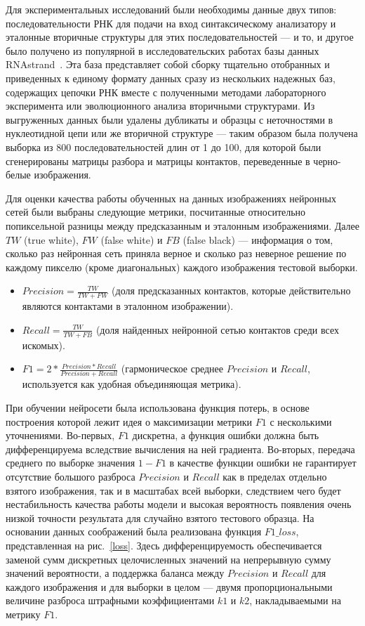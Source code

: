 Для экспериментальных исследований были необходимы данные двух типов: последовательности РНК для подачи на вход синтаксическому анализатору и эталонные вторичные структуры для этих последовательностей --- и то, и другое было получено из популярной в исследовательских работах базы данных RNAstrand~\cite{andronescu2008rna}. Эта база представляет собой сборку тщательно отобранных и приведенных к единому формату данных сразу из нескольких надежных баз, содержащих цепочки РНК вместе с полученными методами лабораторного эксперимента или эволюционного анализа вторичными структурами. Из выгруженных данных были удалены дубликаты и образцы с неточностями в нуклеотидной цепи или же вторичной структуре --- таким образом была получена выборка из 800 последовательностей длин от 1 до 100, для которой были сгенерированы матрицы разбора и матрицы контактов, переведенные в черно-белые изображения.

Для оценки качества работы обученных на данных изображениях нейронных сетей были выбраны следующие метрики, посчитанные относительно попиксельной разницы между предсказанным и эталонным изображениями. Далее $TW$ (true white), $FW$ (false white) и $FB$ (false black) --- информация о том, сколько раз нейронная сеть приняла верное и сколько раз неверное решение по каждому пикселю (кроме диагональных) каждого изображения тестовой выборки.
\begin{itemize} 
    \item $Precision = \frac{TW}{TW + FW}$ (доля предсказанных контактов, которые действительно являются контактами в эталонном изображении).
    \item $Recall = \frac{TW}{TW + FB}$ (доля найденных нейронной сетью контактов среди всех искомых).
    \item $F1 = 2 * \frac{Precision * Recall}{Precision + Recall}$ (гармоническое среднее $Precision$ и $Recall$, используется как удобная объединяющая метрика).
\end{itemize}

При обучении нейросети была использована функция потерь, в основе построения которой лежит идея о максимизации метрики $F1$ с несколькими уточнениями. Во-первых, $F1$ дискретна, а функция ошибки должна быть дифференцируема вследствие вычисления на ней градиента. Во-вторых, передача среднего по выборке значения $1 - F1$ в качестве функции ошибки не гарантирует отсутствие большого разброса $Precision$ и $Recall$ как в пределах отдельно взятого изображения, так и в масштабах всей выборки, следствием чего будет нестабильность качества работы модели и высокая вероятность появления очень низкой точности результата для случайно взятого тестового образца. На основании данных соображений была реализована функция $F1\_loss$, представленная на рис.~\ref{loss}. Здесь дифференцируемость обеспечивается заменой сумм дискретных целочисленных значений на непрерывную сумму значений вероятности, а поддержка баланса между $Precision$ и $Recall$ для каждого изображения и для выборки в целом --- двумя пропорциональными величине разброса штрафными коэффициентами $k1$ и $k2$, накладываемыми на метрику $F1$.

